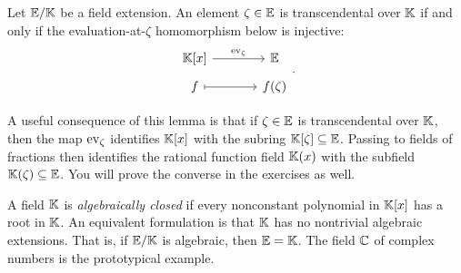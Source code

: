 \documentclass[12pt,reqno]{amsart}
\begin{document}
\begin{lemma}
Let $\mathbb{E}/\mathbb{K}$ be a field extension. An element $\zeta \in \mathbb{E}$ is transcendental over $\mathbb{K}$ if and only if the evaluation-at-$\zeta$ homomorphism below is injective:
\[
\begin{tikzcd}[row sep = .5em, column sep = 3.5em]
\KK[x] \arrow[r, "\ev_{\zeta}"] & \EE \\
f \arrow[r,mapsto] &  f(\zeta)
\end{tikzcd}.
\]
\end{lemma}
A useful consequence of this lemma is that if $\zeta\in \mathbb{E}$ is transcendental over $\mathbb{K}$, then the map $\operatorname{ev}_\zeta$ identifies $\mathbb{K}[x]$ with the subring $\mathbb{K}[\zeta]\subseteq \mathbb{E}$. Passing to fields of fractions then identifies the rational function field $\mathbb{K}(x)$ with the subfield $\mathbb{K}(\zeta)\subseteq \mathbb{E}$. You will prove the converse in the exercises as well.

A field  $\mathbb{K}$ is \emph{algebraically closed} if every nonconstant polynomial in $\mathbb{K}[x]$ has a root in $\mathbb{K}$. An equivalent formulation is that  $\mathbb{K}$ has no nontrivial algebraic extensions. That is, if $\mathbb{E}/\mathbb{K}$ is algebraic, then $\mathbb{E}=\mathbb{K}$. The field $\mathbb{C}$ of complex numbers is the prototypical example.
\end{document}
